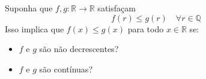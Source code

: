 Suponha que \(f,g\colon \mathbb{R}\to \mathbb{R}\) satisfaçam
\[ f(r)\le g(r)\quad \forall r\in \mathbb{Q} \]
Isso implica que \(f(x)\le g(x)\) para todo \(x\in \mathbb{R}\) se:
\begin{itemize}
  \item[(a)] \(f\) e \(g\) são não decrescentes?
  \item[(b)] \(f\) e \(g\) são contínuas?
\end{itemize}
